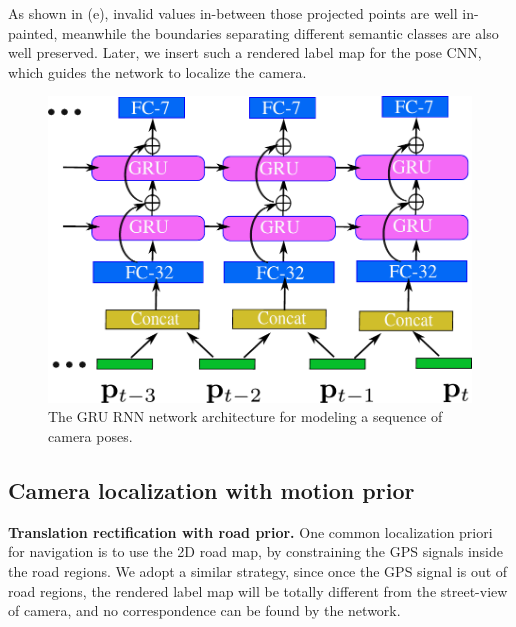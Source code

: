 As shown in (e), invalid values in-between those projected points are well in-painted, meanwhile the boundaries separating different semantic classes are also well preserved. Later, we insert such a rendered label map for the pose CNN, which guides the network to localize the camera.

\begin{figure}[t]
\begin{center}
\includegraphics[width=.8\linewidth]{fig/RNN.pdf}
\end{center}
   \caption{The GRU RNN network architecture for modeling a sequence of camera poses.}
\label{fig:rnn}
\vspace{-1.1\baselineskip}
\end{figure}

\vspace{-0.3\baselineskip}
\subsection{Camera localization with motion prior}
\vspace{-0.2\baselineskip}

\textbf{Translation rectification with road prior.} One common localization priori for navigation is to use the 2D road map, by constraining the GPS signals inside the road regions. We adopt a similar strategy, since once the GPS signal is out of road regions, the rendered label map will be totally different from the street-view of camera, and no correspondence can be found by the network.


